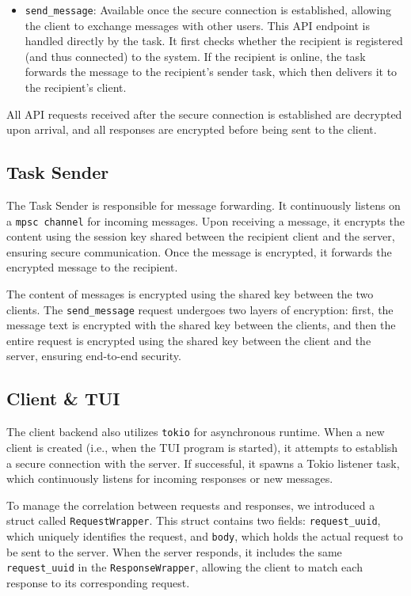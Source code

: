 \begin{itemize}
    \item \texttt{send\_message}: Available once the secure connection is established, allowing the client to exchange messages with other users. This API endpoint is handled directly by the task. It first checks whether the recipient is registered (and thus connected) to the system. If the recipient is online, the task forwards the message to the recipient's sender task, which then delivers it to the recipient's client.
\end{itemize}

All API requests received after the secure connection is established are decrypted upon arrival, and all responses are encrypted before being sent to the client. 

\subsection{Task Sender}
\label{subsec:TaskSender}

The Task Sender is responsible for message forwarding. It continuously listens on a \texttt{mpsc channel} for incoming messages. Upon receiving a message, it encrypts the content using the session key shared between the recipient client and the server, ensuring secure communication. Once the message is encrypted, it forwards the encrypted message to the recipient.

The content of messages is encrypted using the shared key between the two clients. The \texttt{send\_message} request undergoes two layers of encryption: first, the message text is encrypted with the shared key between the clients, and then the entire request is encrypted using the shared key between the client and the server, ensuring end-to-end security.

\subsection{Client \& TUI}
\label{subsec:ClientTUI}

The client backend also utilizes \texttt{tokio} for asynchronous runtime. When a new client is created (i.e., when the TUI program is started), it attempts to establish a secure connection with the server. If successful, it spawns a Tokio listener task, which continuously listens for incoming responses or new messages.  

To manage the correlation between requests and responses, we introduced a struct called \texttt{RequestWrapper}. This struct contains two fields: \texttt{request\_uuid}, which uniquely identifies the request, and \texttt{body}, which holds the actual request to be sent to the server. When the server responds, it includes the same \texttt{request\_uuid} in the \texttt{ResponseWrapper}, allowing the client to match each response to its corresponding request.  

